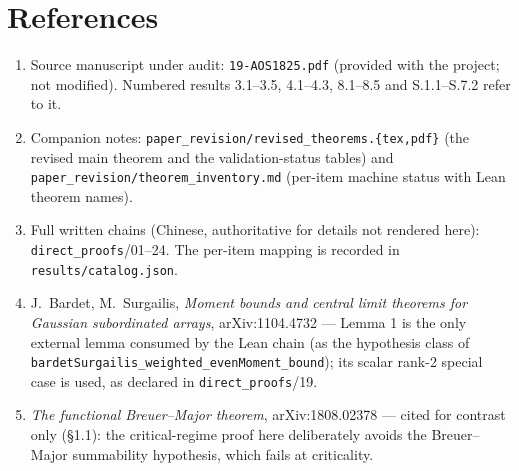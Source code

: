 \documentclass[11pt]{article}
\theoremstyle{definition}
\theoremstyle{remark}
\begin{document}
\section*{References}\label{sec:refs}
\begin{enumerate}
\itemsep2pt
\item Source manuscript under audit: \texttt{19-AOS1825.pdf} (provided with
the project; not modified). Numbered results 3.1--3.5, 4.1--4.3, 8.1--8.5
and S.1.1--S.7.2 refer to it.
\item Companion notes: \texttt{paper\_revision/revised\_theorems.\{tex,pdf\}}
(the revised main theorem and the validation-status tables) and
\texttt{paper\_revision/theorem\_inventory.md} (per-item machine status with
Lean theorem names).
\item Full written chains (Chinese, authoritative for details not rendered
here): \texttt{direct\_proofs}/01--24. The per-item mapping is recorded in
\texttt{results/catalog.json}.
\item J.\ Bardet, M.\ Surgailis, \emph{Moment bounds and central limit
theorems for Gaussian subordinated arrays}, arXiv:1104.4732 --- Lemma 1 is
the only external lemma consumed by the Lean chain (as the hypothesis class
of \texttt{bardetSurgailis\_weighted\_evenMoment\_bound}); its scalar
rank-2 special case is used, as declared in \texttt{direct\_proofs}/19.
\item \emph{The functional Breuer--Major theorem}, arXiv:1808.02378 ---
cited for contrast only (\S1.1): the critical-regime proof here deliberately
avoids the Breuer--Major summability hypothesis, which fails at
criticality.
\end{enumerate}
\end{document}

